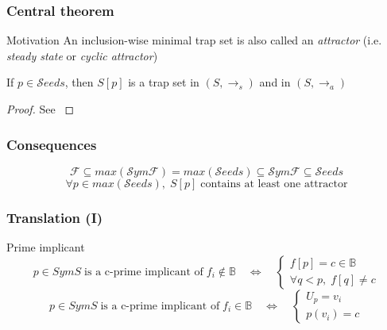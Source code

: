 \documentclass{beamer}
\newcommand{\F}[0]{\mathcal{F}}
\newcommand{\SymF}[0]{\mathcal{S}ym\mathcal{F}}
\newcommand{\Seeds}[0]{\mathcal{S}eeds}
\begin{document}
\begin{frame}
  \frametitle{Central theorem}
  \begin{block}{Motivation}
    An inclusion-wise minimal trap set is also called an \emph{attractor} (i.e. \emph{steady state} or \emph{cyclic attractor})
  \end{block}
  \pause
  \begin{theorem}
    If $ p \in \Seeds $, then $ S[p] $ is a trap set in $ (S, \rightarrow_s) $  and in $ (S, \rightarrow_a) $
  \end{theorem}
  \pause
  \begin{proof}
    See \cite{Klarner}
  \end{proof}
\end{frame}

\begin{frame}
  \frametitle{Consequences}
  \begin{center}
    \begin{equation*}
      \F \subseteq max(\SymF) = max(\Seeds) \subseteq \SymF \subseteq \Seeds
    \end{equation*}
    \bigskip
    \begin{equation*}
      \forall p \in max(\Seeds), \; S[p] \; \text{contains at least one attractor}
    \end{equation*}
  \end{center}
\end{frame}

\begin{frame}
  \frametitle{Translation (I)}
  \begin{block}{Prime implicant}
    \begin{equation*}
      p \in SymS \; \text{is a c-prime implicant of} \; f_i \notin \mathbb{B} \quad \Leftrightarrow \quad \begin{cases} f[p] = c \in \mathbb{B} \\ \forall q < p, \; f[q] \neq c \end{cases}
    \end{equation*}
    \begin{equation*}
      p \in SymS \; \text{is a c-prime implicant of} \; f_i \in \mathbb{B} \quad \Leftrightarrow \quad \begin{cases} U_p = v_i \\ p(v_i) = c \end{cases}
    \end{equation*}
  \end{block}
\end{frame}
\end{document}
